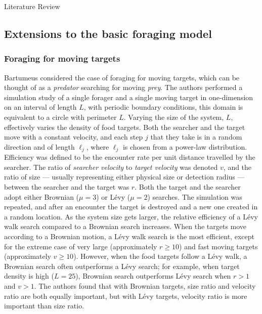 \begin{section}{Literature Review \label{sec:litreview}}
\subsection{Extensions to the basic foraging model}

\subsubsection{Foraging for moving targets}

Bartumeus \etal \cite{Bartumeus_2002} considered the case of foraging for moving targets, which can be thought of as a \emph{predator} searching for moving \emph{prey}.
The authors performed a simulation study of a single forager and a single moving target in one-dimension on an interval of length $L$, with periodic boundary conditions, this domain is equivalent to a circle with perimeter $L$.
Varying the size of the system, $L$, effectively varies the density of food targets.
Both the searcher and the target move with a constant velocity, and each step $j$ that they take is in a random direction and of length $\ell_j$, where $\ell_j$ is chosen from a power-law distribution.
Efficiency was defined to be the encounter rate per unit distance travelled by the searcher.
The ratio of \emph{searcher velocity} to \emph{target velocity} was denoted $v$, and the ratio of size --- usually representing either physical size or detection radius --- between the searcher and the target was $r$.
Both the target and the searcher adopt either Brownian ($\mu=3$) or L\'{e}vy ($\mu=2$) searches.
The simulation was repeated, and after an encounter the target is destroyed and a new one created in a random location.
As the system size gets larger, the relative efficiency of a L\'{e}vy walk search compared to a Brownian search increases.
When the targets move according to a Brownian motion, a L\'{e}vy walk search is the most efficient, except for the extreme case of very large (approximately $r\geq 10$) and fast moving targets (approximately $v \geq 10$).
However, when the food targets follow a L\'{e}vy walk, a Brownian search often outperforms a L\'{e}vy search; for example, when target density is high ($L = 25$), Brownian search outperforms L\'{e}vy search when $r>1$ and $v>1$.
The authors found that with Brownian targets, size ratio and velocity ratio are both equally important, but with L\'{e}vy targets, velocity ratio is more important than size ratio.


\end{section}
